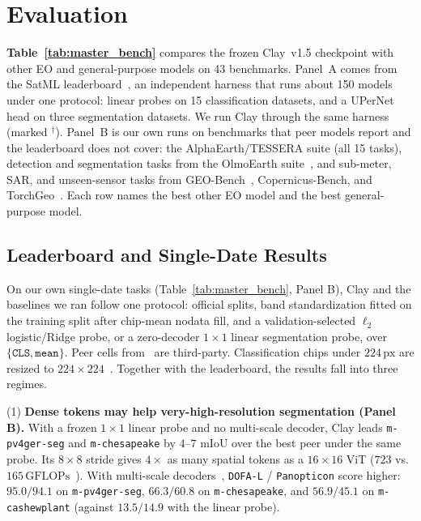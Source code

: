 \section{Evaluation}
\label{sec:comparative}

\textbf{Table~\ref{tab:master_bench}} compares the frozen Clay~v1.5 checkpoint with other EO and general-purpose models on 43 benchmarks. Panel~A comes from the SatML leaderboard~\cite{taylorgeospatial2026satml}, an independent harness that runs about 150 models under one protocol: linear probes on 15 classification datasets, and a UPerNet head on three segmentation datasets. We run Clay through the same harness (marked $^\dagger$). Panel~B is our own runs on benchmarks that peer models report and the leaderboard does not cover: the AlphaEarth/TESSERA suite (all 15 tasks), detection and segmentation tasks from the OlmoEarth suite~\cite{herzog2026olmoearth,olmoearth2026v13}, and sub-meter, SAR, and unseen-sensor tasks from GEO-Bench~\cite{lacoste2023geobench}, Copernicus-Bench, and TorchGeo~\cite{stewart2022torchgeo}. Each row names the best other EO model and the best general-purpose model.

\subsection{Leaderboard and Single-Date Results}
\label{sec:std_bench}

On our own single-date tasks (Table~\ref{tab:master_bench}, Panel B), Clay and the baselines we ran follow one protocol: official splits, band standardization fitted on the training split after chip-mean nodata fill, and a validation-selected $\ell_2$ logistic/Ridge probe, or a zero-decoder $1\times 1$ linear segmentation probe, over $\{\texttt{CLS},\texttt{mean}\}$. Peer cells from~\cite{olmoearth2026v13} are third-party. Classification chips under $224\,\text{px}$ are resized to $224\times 224$~\cite{corley2024resize}. Together with the leaderboard, the results fall into three regimes.

(1) \textbf{Dense tokens may help very-high-resolution segmentation (Panel B).} With a frozen $1\times 1$ linear probe and no multi-scale decoder, Clay leads \texttt{m-pv4ger-seg} and \texttt{m-chesapeake} by $4\text{--}7$ mIoU over the best peer under the same probe. Its $8\times 8$ stride gives $4\times$ as many spatial tokens as a $16\times 16$ ViT ($723$ vs. $165\,\text{GFLOPs}$~\cite{sharma2026vhrbench}). With multi-scale decoders~\cite{xiong2024dofa,waldmann2025panopticon}, \texttt{DOFA-L} / \texttt{Panopticon} score higher: $95.0/94.1$ on \texttt{m-pv4ger-seg}, $66.3/60.8$ on \texttt{m-chesapeake}, and $56.9/45.1$ on \texttt{m-cashewplant} (against $13.5/14.9$ with the linear probe).

